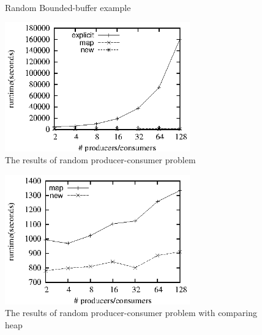 \documentclass[preprint]{sigplanconf}
\begin{document}
\begin{figure}
  \centering
  \\
  \caption{Random Bounded-buffer example}
  \label{fig:rbb_exp}
\end{figure}
\begin{figure}[ht!]
  \centering
  \includegraphics[width=80mm]{fig/rpc.eps}
  \caption{The results of random producer-consumer problem}
  \label{fig:rpc_eval}
\end{figure}

\begin{figure}[ht!]
  \centering
  \includegraphics[width=80mm]{fig/rpch.eps}
  \caption{The results of random producer-consumer problem with comparing heap}
  \label{fig:rpc_eval}
\end{figure}
\end{document}
